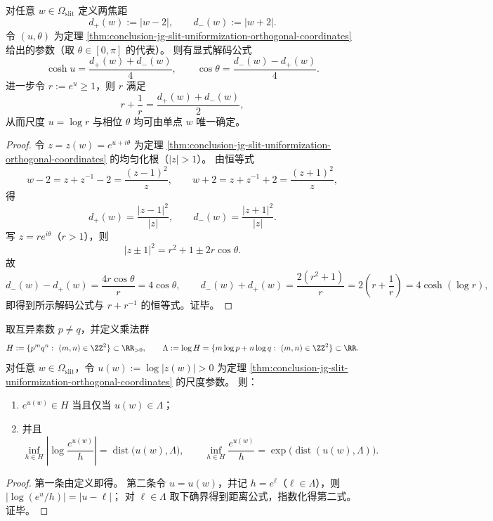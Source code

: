 \begin{theorem}\label{thm:conclusion-jg-focal-distance-decoding}
对任意 \(w\in\Omega_{\mathrm{slit}}\) 定义两焦距
\[
d_{+}(w):=|w-2|,
\qquad
d_{-}(w):=|w+2|.
\]
令 \((u,\theta)\) 为定理 \ref{thm:conclusion-jg-slit-uniformization-orthogonal-coordinates} 给出的参数（取 \(\theta\in[0,\pi]\) 的代表）。
则有显式解码公式
\[
\cosh u=\frac{d_{+}(w)+d_{-}(w)}{4},
\qquad
\cos\theta=\frac{d_{-}(w)-d_{+}(w)}{4}.
\]
进一步令 \(r:=e^{u}\ge 1\)，则 \(r\) 满足
\[
r+\frac1r=\frac{d_{+}(w)+d_{-}(w)}{2},
\]
从而尺度 \(u=\log r\) 与相位 \(\theta\) 均可由单点 \(w\) 唯一确定。
\end{theorem}
\begin{proof}
令 \(z=z(w)=e^{u+i\theta}\) 为定理 \ref{thm:conclusion-jg-slit-uniformization-orthogonal-coordinates} 的均匀化根（\(|z|>1\)）。
由恒等式
\[
w-2=z+z^{-1}-2=\frac{(z-1)^2}{z},\qquad
w+2=z+z^{-1}+2=\frac{(z+1)^2}{z},
\]
得
\[
d_{+}(w)=\frac{|z-1|^2}{|z|},\qquad
d_{-}(w)=\frac{|z+1|^2}{|z|}.
\]
写 \(z=re^{i\theta}\)（\(r>1\)），则
\[
|z\pm1|^2=r^2+1\pm2r\cos\theta.
\]
故
\[
d_{-}(w)-d_{+}(w)=\frac{4r\cos\theta}{r}=4\cos\theta,
\qquad
d_{-}(w)+d_{+}(w)=\frac{2(r^2+1)}{r}=2\left(r+\frac1r\right)=4\cosh(\log r),
\]
即得到所示解码公式与 \(r+r^{-1}\) 的恒等式。证毕。
\end{proof}

\begin{proposition}\label{prop:conclusion-jg-godel-loglattice-approximation}
取互异素数 \(p\neq q\)，并定义乘法群
\[
H:=\{p^{m}q^{n}:\ (m,n)\in\ZZ^2\}\subset\RR_{>0},
\qquad
\Lambda:=\log H=\{m\log p+n\log q:\ (m,n)\in\ZZ^2\}\subset\RR.
\]
对任意 \(w\in\Omega_{\mathrm{slit}}\)，令 \(u(w):=\log|z(w)|>0\) 为定理 \ref{thm:conclusion-jg-slit-uniformization-orthogonal-coordinates} 的尺度参数。
则：
\begin{enumerate}
\normalfont
  \item \(e^{u(w)}\in H\) 当且仅当 \(u(w)\in\Lambda\)；
  \item 并且
  \[
  \inf_{h\in H}\left|\log\frac{e^{u(w)}}{h}\right|
  =\operatorname{dist}\bigl(u(w),\Lambda\bigr),
  \qquad
  \inf_{h\in H}\frac{e^{u(w)}}{h}
  =\exp\!\bigl(\operatorname{dist}(u(w),\Lambda)\bigr).
  \]
\end{enumerate}
\end{proposition}
\begin{proof}
第一条由定义即得。
第二条令 \(u=u(w)\)，并记 \(h=e^\ell\)（\(\ell\in\Lambda\)），则
\(
|\log(e^u/h)|=|u-\ell|
\)；
对 \(\ell\in\Lambda\) 取下确界得到距离公式，指数化得第二式。证毕。
\end{proof}

